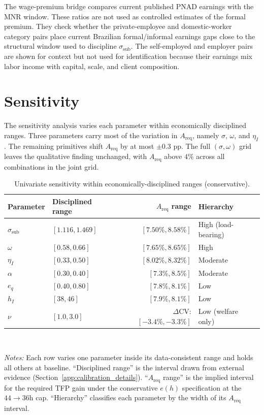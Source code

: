 \documentclass[12pt,a4paper]{article}
\begin{document}
The wage-premium bridge compares current published PNAD earnings with the MNR window. These ratios are not used as controlled estimates of the formal premium. They check whether the private-employee and domestic-worker category pairs place current Brazilian formal/informal earnings gaps close to the structural window used to discipline $\sigma_{\text{sub}}$. The self-employed and employer pairs are shown for context but not used for identification because their earnings mix labor income with capital, scale, and client composition.



\clearpage
\section{Sensitivity}\label{app:sensitivity}

The sensitivity analysis varies each parameter within economically disciplined ranges. Three parameters carry most of the variation in $A_{\text{req}}$, namely $\sigma$, $\omega$, and $\eta_I$. The remaining primitives shift $A_{\text{req}}$ by at most $\pm 0.3$ pp. The full $(\sigma,\omega)$ grid leaves the qualitative finding unchanged, with $A_{\text{req}}$ above $4\%$ across all combinations in the joint grid.

\begin{table}[htbp]
\centering
\caption{Univariate sensitivity within economically-disciplined ranges (conservative).}\label{tab:sensitivity_univariate}
\small
\begin{tabular}{llrl}
\hline\hline
Parameter & Disciplined range & $A_{\text{req}}$ range & Hierarchy \\
\hline
$\sigma_{\text{sub}}$ & $[1.116, 1.469]$ & $[7.50\%, 8.58\%]$ & High (load-bearing) \\
$\omega$ & $[0.58, 0.66]$ & $[7.65\%, 8.65\%]$ & High \\
$\eta_I$ & $[0.33, 0.50]$ & $[8.02\%, 8.32\%]$ & Moderate \\
$\alpha$ & $[0.30, 0.40]$ & $[7.3\%, 8.5\%]$ & Moderate \\
$e_q$ & $[0.40, 0.80]$ & $[7.8\%, 8.1\%]$ & Low \\
$h_I$ & $[38, 46]$ & $[7.9\%, 8.1\%]$ & Low \\
$\nu$ & $[1.0, 3.0]$ & $\Delta$CV: $[-3.4\%, -3.3\%]$ & Low (welfare only) \\
\hline\hline
\end{tabular}
\\[2pt]
\begin{minipage}{0.95\textwidth}
\justifying
{\footnotesize \textit{Notes:} Each row varies one parameter inside its data-consistent range and holds all others at baseline. ``Disciplined range'' is the interval drawn from external evidence (Section~\ref{app:calibration_details}). ``$A_{\text{req}}$ range'' is the implied interval for the required TFP gain under the conservative $e(h)$ specification at the $44\to 36$h cap. ``Hierarchy'' classifies each parameter by the width of its $A_{\text{req}}$ interval.}
\end{minipage}
\end{table}
\end{document}
